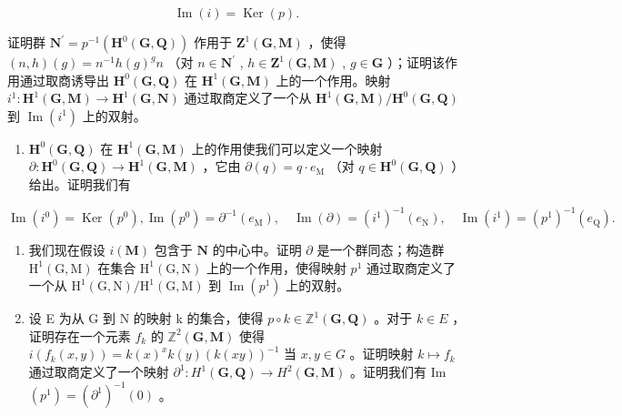 \[
\operatorname{Im} (i) = \operatorname{Ker} (p).
\]

证明群 \(\mathbf{N}^{\prime}=p^{-1}(\mathbf{H}^{0}(\mathbf{G},\mathbf{Q}))\) 作用于 \(\mathbf{Z}^{1}(\mathbf{G},\mathbf{M})\) ，使得 \((n,h)(g)=n^{-1}h(g)^{g}n\) （对 \(n\in\mathbf{N}^{\prime}\) , \(h\in\mathbf{Z}^{1}(\mathbf{G},\mathbf{M})\) , \(g\in\mathbf{G}\) ）；证明该作用通过取商诱导出 \(\mathbf{H}^{0}(\mathbf{G},\mathbf{Q})\) 在 \(\mathbf{H}^{1}(\mathbf{G},\mathbf{M})\) 上的一个作用。映射 \(i^{1}:\mathbf{H}^{1}(\mathbf{G},\mathbf{M})\to\mathbf{H}^{1}(\mathbf{G},\mathbf{N})\) 通过取商定义了一个从 \(\mathbf{H}^{1}(\mathbf{G},\mathbf{M})/\mathbf{H}^{0}(\mathbf{G},\mathbf{Q})\) 到 \(\operatorname{Im}(i^{1})\) 上的双射。

\begin{enumerate}
\def\labelenumi{\alph{enumi})}
\setcounter{enumi}{3}
\tightlist
\item
  \(\mathbf{H}^0 (\mathbf{G},\mathbf{Q})\) 在 \(\mathbf{H}^{1}(\mathbf{G},\mathbf{M})\) 上的作用使我们可以定义一个映射 \(\partial :\mathbf{H}^{0}(\mathbf{G},\mathbf{Q})\to \mathbf{H}^{1}(\mathbf{G},\mathbf{M})\) ，它由 \(\partial (q) = q\cdot e_{\mathrm{M}}\) （对 \(q\in \mathbf{H}^0 (\mathbf{G},\mathbf{Q})\) ）给出。证明我们有
\end{enumerate}

\[
\operatorname{Im} \left(i ^ {0}\right) = \operatorname{Ker} \left(p ^ {0}\right), \operatorname{Im} \left(p ^ {0}\right) = \partial^ {- 1} (e _ {\mathrm{M}}), \quad \operatorname{Im} (\partial) = (i ^ {1}) ^ {- 1} \left(e _ {\mathrm{N}}\right), \quad \operatorname{Im} \left(i ^ {1}\right) = (p ^ {1}) ^ {- 1} \left(e _ {\mathrm{Q}}\right).
\]

\begin{enumerate}
\def\labelenumi{\alph{enumi})}
\setcounter{enumi}{4}
\item
  我们现在假设 \(i(\mathbf{M})\) 包含于 \(\mathbf{N}\) 的中心中。证明 \(\partial\) 是一个群同态；构造群 \(\mathrm{H}^{1}(\mathrm{G},\mathrm{M})\) 在集合 \(\mathrm{H}^{1}(\mathrm{G},\mathrm{N})\) 上的一个作用，使得映射 \(p^1\) 通过取商定义了一个从 \(\mathrm{H}^{1}(\mathrm{G},\mathrm{N}) / \mathrm{H}^{1}(\mathrm{G},\mathrm{M})\) 到 \(\operatorname{Im}(p^1)\) 上的双射。
\item
  设 E 为从 G 到 N 的映射 k 的集合，使得 \(p \circ k \in \mathbb{Z}^{1}(\mathbf{G}, \mathbf{Q})\) 。对于 \(k \in E\) ，证明存在一个元素 \(f_{k}\) 的 \(\mathbb{Z}^{2}(\mathbf{G}, \mathbf{M})\) 使得 \(i(f_{k}(x, y)) = k(x)^{x} k(y)(k(xy))^{-1}\) 当 \(x, y \in G\) 。证明映射 \(k \mapsto f_{k}\) 通过取商定义了一个映射 \(\partial^{1}: H^{1}(\mathbf{G}, \mathbf{Q}) \to H^{2}(\mathbf{G}, \mathbf{M})\) 。证明我们有 Im \((p^{1}) = (\partial^{1})^{-1}(0)\) 。
\end{enumerate}

